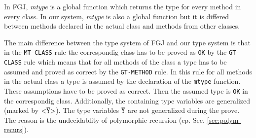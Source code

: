 {\begin{minipage}{\textwidth}
\begin{small}
\end{small}
\end{minipage}
}

\medskip
In FGJ, \textit{mtype} is a global function which returns the type for every method in every class.
In our system, \textit{mtype} is also a global function but it is differed between
methods declared in the actual class and methods from other classes.

The main difference between the type system of FGJ and our type system is that
in the \texttt{MT-CLASS} rule the correspondig class has to be proved as \texttt{OK}
by the \texttt{GT-CLASS} rule which means that for all methods of the class a type has to
be assumed and proved as correct by the \texttt{GT-METHOD} rule.
In this rule
for all methods in the actual class a type is assumed by the
declaration of the \texttt{mtype} function.
These assumptions have to be proved as correct. Then the assumed type is
\texttt{OK} in the correspondig class. Additionally, the containing type
variables are generalized (marked by $\mathtt{ {\tt <} \overline{\tt Y} {\tt >} }$). The type variables
$\overline{\tt \mathtt{Y}}$ are not generalized during the prove. The reason is the
undecidablity of polymorphic recursion (cp. Sec. \ref{sec:polym-recurs}).




